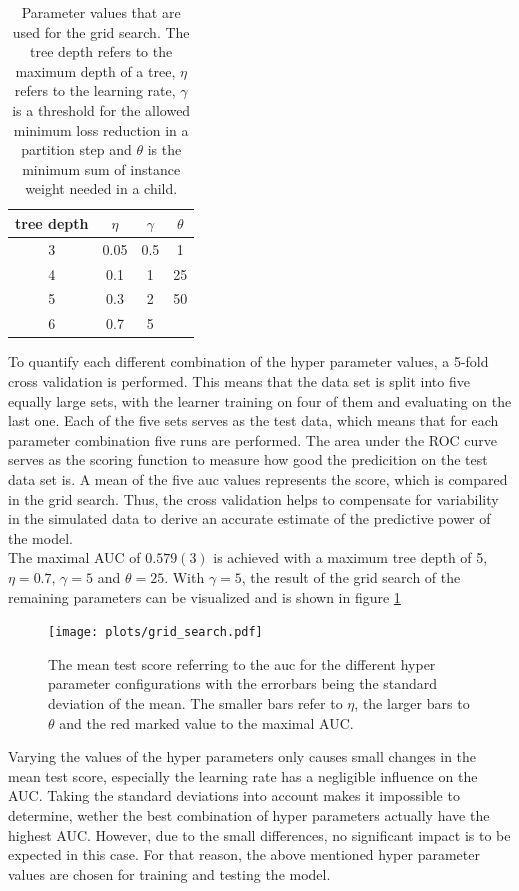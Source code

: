   \begin{table}
    \centering
    \begin{tabular}{c c c c}
      \toprule
      tree depth & $\eta$ & $\gamma$ & $\theta$ \\
      \midrule
      3 & 0.05 & 0.5 & 1  \\
      4 & 0.1  & 1   & 25  \\
      5 & 0.3  & 2 & 50  \\
      6 & 0.7  & 5   &  \\
    \end{tabular}
    \caption{Parameter values that are used for the grid search. The tree depth refers to the maximum depth of a tree, $\eta$ refers to the learning rate,
    $\gamma$ is a threshold for the allowed minimum loss reduction in a partition step and $\theta$ is the minimum sum of instance weight needed in a child.}
    \label{tab:grid}
  \end{table}
To quantify each different combination of the hyper parameter values, a 5-fold cross validation is performed. This means that the data set is split into five equally
large sets, with the learner training on four of them and evaluating on the last one. Each of the five sets serves as the test data, which means that for each
parameter combination five runs are performed. The area under the ROC curve serves as the scoring function to measure how good the predicition on the test data set is.
A mean of the five auc values represents the score, which is compared in the grid search. Thus, the cross validation helps to compensate for variability in the simulated
data to derive an accurate estimate of the predictive power of the model. \\
The maximal AUC of $0.579(3)$ is achieved with a maximum tree depth of 5, $\eta=0.7$, $\gamma=5$ and $\theta=25$. With $\gamma=5$, the result of the grid search of the remaining
parameters can be visualized and is shown in figure \ref{fig:grid}

\begin{figure}
  \centering
  \texttt{[image: plots/grid\_search.pdf]}
  \caption{The mean test score referring to the auc for the different hyper parameter configurations with the errorbars being the standard deviation of the mean. The
  smaller bars refer to $\eta$, the larger bars to $\theta$ and the red marked value to the maximal AUC.}
  \label{fig:grid}
\end{figure}

Varying the values of the hyper parameters only causes small changes in the mean test score, especially the learning rate has a negligible influence on the AUC. Taking the
standard deviations into account makes it impossible to determine, wether the best combination of hyper parameters actually have the highest AUC. However, due to the
small differences, no significant impact is to be expected in this case. For that reason, the above mentioned hyper parameter values are chosen for training and testing the model.

